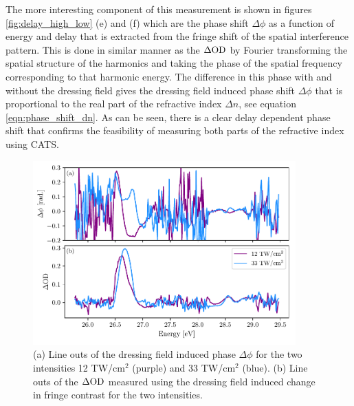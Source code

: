 The more interesting component of this measurement is shown in figures \ref{fig:delay_high_low} (e) and (f) which are the phase shift $\Delta\phi$ as a function of energy and delay that is extracted from the fringe shift of the spatial interference pattern.  This is done in similar manner as the $\dod$ by Fourier transforming the spatial structure of the harmonics and taking the phase of the spatial frequency corresponding to that harmonic energy.  The difference in this phase with and without the dressing field gives the dressing field induced phase shift $\Delta\phi$ that is proportional to the real part of the refractive index $\Delta n$, see equation \ref{eqn:phase_shift_dn}.  As can be seen, there is a clear delay dependent phase shift that confirms the feasibility of measuring both parts of the refractive index using CATS. 

\begin{figure}
	\centering
	\includegraphics[width=0.9\textwidth]{figures/CATS/dphi_dod_lineout.pdf}
	\caption[Line outs of $\Delta\phi$ and $\dod$ for $\tau=0$ using CATS]{(a) Line outs of the dressing field induced phase $\Delta\phi$ for the two intensities 12 TW/cm$^2$ (purple) and 33 TW/cm$^2$ (blue).  (b) Line outs of the $\dod$ measured using the dressing field induced change in fringe contrast for the two intensities.}
	\label{fig:dphi_dod_lineout}
\end{figure}

